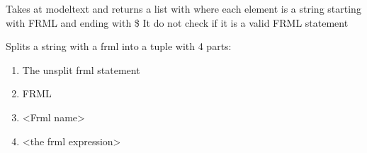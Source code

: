 \documentclass[letterpaper,10pt,english]{sphinxmanual}
\begin{document}

\begin{fulllineitems}
\label{\detokenize{index:modelpattern.find_frml}}
\pysigstartsignatures
{}
\pysigstopsignatures
\sphinxAtStartPar
Takes at modeltext and returns a list with where each element is
a string starting  with FRML and ending with \$
It do not check if it is a valid FRML statement

\end{fulllineitems}


\begin{fulllineitems}
\label{\detokenize{index:modelpattern.split_frml}}
\pysigstartsignatures
{}
\pysigstopsignatures
\sphinxAtStartPar
Splits a string with a frml into a tuple with 4 parts:
\begin{enumerate}
%
\setcounter{enumi}{-1}
\item {} 
\sphinxAtStartPar
The unsplit frml statement

\item {} 
\sphinxAtStartPar
FRML

\item {} 
\sphinxAtStartPar
\textless{}Frml name\textgreater{}

\item {} 
\sphinxAtStartPar
\textless{}the frml expression\textgreater{}

\end{enumerate}

\end{fulllineitems}

\end{document}
